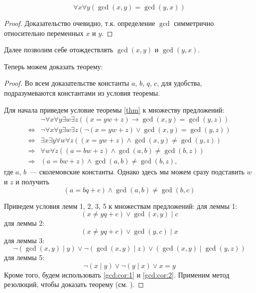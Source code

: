 \documentclass[12pt, a4paper, oneside]{memoir}
\begin{document}
\begin{lemma}
    \[\forall x \forall y (\gcd(x, y) = \gcd(y, x))\]
\end{lemma}
\begin{proof}
    Доказательство очевидно, т.к. определение $\gcd$ симметрично относительно переменных $x$ и $y$.
\end{proof}
Далее позволим себе отождествлять $\gcd(x, y)$ и $\gcd(y, x)$.

Теперь можем доказать теорему:
\begin{proof}
    Во всем доказательстве константы $a$, $b$, $q$, $c$, для удобства, подразумеваются константами из условия теоремы.

    Для начала приведем условие теоремы \eqref{thm} к множеству предложений:
    \begin{align*}
                          & \lnot \forall x \forall y \exists w \exists z ((x = yw + z) \rightarrow \gcd(x, y) = \gcd(y, z)) \\
        \Leftrightarrow{} & \lnot \forall x \forall y \exists w \exists z (\lnot (x = yw + z) \lor \gcd(x, y) = \gcd(y, z))  \\
        \Leftrightarrow{} & \exists x \exists y \forall w \forall z ((x = yw + z) \land \gcd(x, y) \neq \gcd(y, z))          \\
        \Rightarrow{}     & \forall w \forall z ((a = bw + z) \land \gcd(a, b) \neq \gcd(b, z))                              \\
        \Rightarrow{}     & (a = bw + z) \land \gcd(a, b) \neq \gcd(b, z),
    \end{align*}
    где $a$, $b$~--- сколемовские константы.
    Однако здесь мы можем сразу подставить $w$ и $z$ и получить
    \[(a = bq + c) \land \gcd(a, b) \neq \gcd(b, c)\]

    Приведем условия лемм 1, 2, 3, 5 к множествам предложений:
    для леммы 1:
    \[(x \neq yq + c) \lor \gcd(x, y) \mid c\]
    для леммы 2:
    \[(x \neq yq + c) \lor \gcd(y, c) \mid x\]
    для леммы 3:
    \[\lnot (\gcd(x, y) \mid y) \lor \lnot (\gcd(x, y) \mid z) \lor (\gcd(x, y) \mid \gcd(y, z))\]
    для леммы 5:
    \[\lnot (x \mid y) \lor \lnot (y \mid x) \lor x = y\]
    Кроме того, будем использовать \eqref{gcd:cor:1} и \eqref{gcd:cor:2}.
    Применим метод резолюций, чтобы доказать теорему (см. ).
\end{proof}
\end{document}
